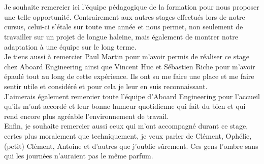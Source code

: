 \thispagestyle{empty}
\chapter*{}
\begin{flushright}
  \begin{minipage}[t]{0.6\textwidth}
	Je souhaite remercier ici l'équipe pédagogique de la formation pour nous
	proposer une telle opportunité. Contrairement aux autres stages
	effectués lors de notre cursus, celui-ci s'étale sur toute une année et nous
	permet, non seulement de travailler sur un projet de longue haleine, mais
	également de montrer notre adaptation à une équipe sur le long terme.\\

	Je tiens aussi à remercier Paul {\sc Martin} pour m'avoir permis de réaliser
	ce stage chez Aboard Engineering ainsi que Vincent {\sc Huc} et Sébastien
	{\sc Riche} pour m'avoir épaulé tout au long de cette expérience. Ils ont su
	me faire une place et me faire sentir utile et considéré et pour cela je leur
	en suis reconnaissant.\\
	J'aimerais également remercier toute l'équipe d'Aboard Engineering pour
	l'accueil qu'ils m'ont accordé et leur bonne humeur quotidienne qui fait du
	bien et qui rend encore plus agréable l'environnement de travail.\\

	Enfin, je souhaite remercier aussi ceux qui m'ont accompagné durant ce
	stage, certes plus moralement que techniquement, je veux parler de Clément,
	Ophélie, (petit) Clément, Antoine et d'autres que j'oublie sûrement. Ces gens
	l'ombre sans qui les journées n'auraient pas le même parfum.
  \end{minipage}
\end{flushright}
